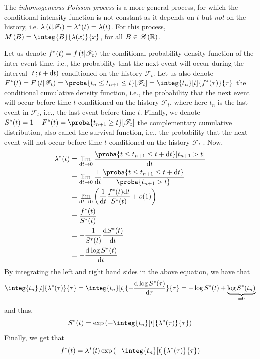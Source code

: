 The \textit{inhomogeneous Poisson process} is a more general process, for which the conditional intensity function is not constant as it depends on $t$ but \textit{not} on the history, i.e. $\lambda\left( t \middle| \mathscr{F}_t \right) = \lambda^*(t) = \lambda(t)$.
For this process, $M\pars{B} = \integ{B}{\lambda(x)}{x}$, for all $B \in \mathscr{B}\left( \mathbb{R} \right)$.

Let us denote $f^*(t) = f\left( t \middle| \mathscr{F}_t \right)$ the conditional probability density function of the inter-event time, i.e., the probability that the next event will occur during the interval $\left[ t \, ; t+\mathrm{d} t \right)$ conditioned on the history $\mathscr{F}_t$.
Let us also denote $F^*(t) = F\pars{t \middle| \mathscr{F}_t} = \proba{t_n \leq t_{n+1} \leq t}[\mathscr{F}_t] =  \integ{t_{n}}[t]{f^*(\tau)}{\tau}$ the conditional cumulative density function, i.e., the probability that the next event will occur before time $t$ conditioned on the history $\mathscr{F}_t$, where here $t_n$ is the last event in $\mathscr{F}_t$, i.e., the last event before time $t$.
Finally, we denote $S^*(t) = 1 - F^*(t) = \proba{t_{n+1} \geq t}[\mathscr{F}_t]$ the complementary cumulative distribution, also called the survival function, i.e., the probability that the next event will not occur before time $t$ conditioned on the history $\mathscr{F}_t$ \citep{de2019temporal}.
Now,
\begin{equation}
    \begin{split}
        \lambda^*(t) &= \lim_{\dint t \to 0} \frac{\proba{t\leq t_{n+1} \leq t+\dint t}[t_{n+1} > t]}{\dint t} \\
        &= \lim_{\dint t \to 0} \frac{1}{\dint t} \frac{\proba{t\leq t_{n+1} \leq t+\dint t}}{\proba{t_{n+1} > t}} \\
        &= \lim_{\dint t \to 0} \pars{\frac{1}{\dint t}\frac{f^*(t)\dint t}{S^*(t)} + o(1)} \\
        &= \frac{f^*(t)}{S^*(t)} \\
        &= - \frac{1}{S^*(t)} \deriv{S^*(t)}{t} \\
        &= -\deriv{\log S^*(t)}{t}
    \end{split}
\end{equation}
By integrating the left and right hand sides in the above equation, we have that
\begin{equation}
    \integ{t_n}[t]{\lambda^*(\tau)}{\tau} = \integ{t_n}[t]{-\deriv{\log S^*(\tau)}{\tau}}{\tau} = -\log S^*(t) + \underbrace{\log S^*(t_n)}_{=0}
\end{equation}
and thus,
\begin{equation}
    S^*(t) = \e{- \integ{t_n}[t]{\lambda^*(\tau)}{\tau}}
\end{equation}
Finally, we get that
\begin{equation}\label{eq:f_star_res}
    f^*(t) = \lambda^*(t) \e{- \integ{t_n}[t]{\lambda^*(\tau)}{\tau}}
\end{equation}

